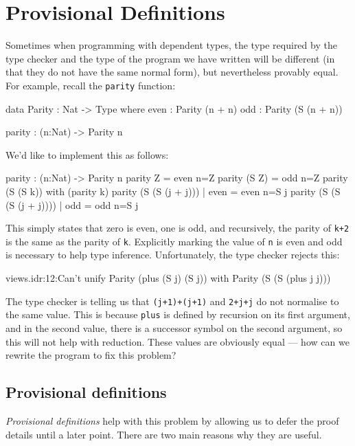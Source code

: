 \section{Provisional Definitions}
\label{sect:provisional}

Sometimes when programming with dependent types, the type required by the type checker and the type of the program we have written will be different (in that they do not have the same normal form), but nevertheless provably equal.
For example, recall the \texttt{parity} function:

\begin{code}
data Parity : Nat -> Type where
   even : Parity (n + n)
   odd  : Parity (S (n + n))

parity : (n:Nat) -> Parity n
\end{code}

\noindent
We'd like to implement this as follows:

\begin{code}
parity : (n:Nat) -> Parity n
parity Z     = even {n=Z}
parity (S Z) = odd {n=Z}
parity (S (S k)) with (parity k)
  parity (S (S (j + j)))     | even = even {n=S j}
  parity (S (S (S (j + j)))) | odd  = odd {n=S j}
\end{code}

\noindent
This simply states that zero is even, one is odd, and recursively, the parity of \texttt{k+2} is the same as the parity of \texttt{k}. 
Explicitly marking the value of \texttt{n} is even and odd is necessary to help type inference.
Unfortunately, the type checker rejects this:

\begin{code}
views.idr:12:Can't unify Parity (plus (S j) (S j)) with 
Parity (S (S (plus j j)))
\end{code}

\noindent
The type checker is telling us that \texttt{(j+1)+(j+1)} and \texttt{2+j+j} do not normalise to the same value.
This is because \texttt{plus} is defined by recursion on its first argument, and in the second value, there is a successor symbol on the second argument, so this will not help with reduction.
These values are obviously equal --- how can we rewrite the program to fix this problem?

\subsection{Provisional definitions}

\emph{Provisional definitions} help with this problem by allowing us to defer the proof details until a later point.
There are two main reasons why they are useful.

